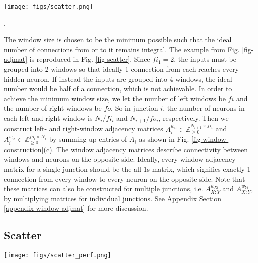 \documentclass[conference]{IEEEtran}
\begin{document}
\begin{figure*}[!t]
\begin{center}
\texttt{[image: figs/scatter.png]}
\end{center}
\caption{Window adjacency matrices and scatter. Green neurons indicate ideal connectivity. The hidden layer is split into 2 to show separate constructions of $A_1^{w_{1r}}$ and $A_2^{w_{2l}}$}.
\label{fig-scatter}
\end{figure*}

The window size is chosen to be the minimum possible such that the ideal number of connections from or to it remains integral. The example from Fig. \ref{fig-adjmat} is reproduced in Fig. \ref{fig-scatter}. Since $fi_1=2$, the inputs must be grouped into 2 windows so that ideally 1 connection from each reaches every hidden neuron. If instead the inputs are grouped into 4 windows, the ideal number would be half of a connection, which is not achievable. In order to achieve the minimum window size, we let the number of left windows be $fi$ and the number of right windows be $fo$. So in junction $i$, the number of neurons in each left and right window is $N_i/fi_i$ and $N_{i+1}/fo_i$, respectively. Then we construct left- and right-window adjacency matrices $A_i^{w_{il}}\in \mathbb{Z}_{\geq 0}^{N_{i+1}\times fi_i}$ and $A_i^{w_{ir}} \in \mathbb{Z}_{\geq 0}^{fo_i\times N_i}$ by summing up entries of $A_i$ as shown in Fig. \ref{fig-window-construction}(c). The window adjacency matrices describe connectivity between windows and neurons on the opposite side. Ideally, every window adjacency matrix for a single junction should be the all 1s matrix, which signifies exactly 1 connection from every window to every neuron on the opposite side. Note that these matrices can also be constructed for multiple junctions, i.e. $A_{X:Y}^{w_{Xl}}$ and $A_{X:Y}^{w_{Yr}}$, by multiplying matrices for individual junctions. See Appendix Section \ref{appendix-window-adjmat} for more discussion.

\subsection{Scatter}\label{scatter}

\begin{figure*}[!t]
\begin{center}
\texttt{[image: figs/scatter\_perf.png]}
\end{center}
\caption{Network performance vs. scatter for CL only networks of (a) Morse (b) MNIST, and convolutional network with 2 CL junctions of (c) CIFAR10. All minimum values that need to be considered to differentiate between connection patterns are bolded.}
\label{fig-scatterperf}
\end{figure*}
\end{document}
